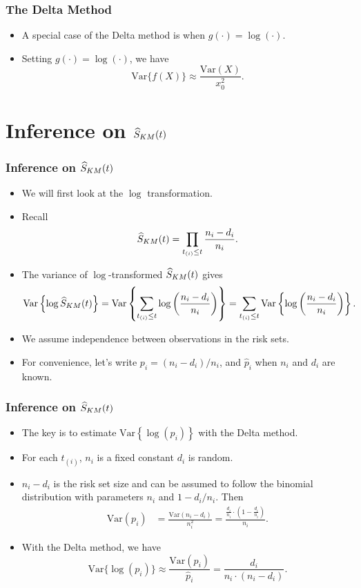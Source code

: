 \documentclass[10pt]{beamer}\usepackage[]{graphicx}\usepackage[]{color}
\newcommand{\Var}{\mathrm{Var}}
\newcommand{\E}{\mathrm{E}}
\newcommand{\Skm}{\widehat{S}_{\scriptsize{KM}}}
\begin{document}
\begin{frame}
  \frametitle{The Delta Method}
  \begin{itemize}
    \item A special case of the Delta method is when $g(\cdot) = \log(\cdot)$.
    \item Setting $g(\cdot) = \log(\cdot)$, we have
      $$ \Var\{f(X)\}\approx \frac{\Var(X)}{x_0^2}.$$
  \end{itemize}
\end{frame}

\section{Inference on $\Skm(t)$}
\begin{frame}
  \frametitle{Inference on $\Skm(t)$}
  \begin{itemize}
    \item We will first look at the $\log$ transformation.
    \item Recall $$\Skm(t) = \prod_{t_{(i)}\le t}\frac{n_i - d_i}{n_i}.$$
    \item The variance of $\log$-transformed $\Skm(t)$ gives
       $$\Var\left\{\log\Skm(t)\right\} = \Var\left\{\sum_{t_{(i)}\le t}\log\left(\frac{n_i - d_i}{n_i}\right)\right\} = 
       \sum_{t_{(i)}\le t}\Var\left\{\log\left(\frac{n_i - d_i}{n_i}\right)\right\}.$$
     \item We assume independence between observations in the risk sets.
     \item For convenience, let's write $p_i = (n_i - d_i) / n_i$, and $\hat p_i$ when $n_i$ and $d_i$ are known.
  \end{itemize}
\end{frame}


\begin{frame}
  \frametitle{Inference on $\Skm(t)$}
  \begin{itemize}
  \item The key is to estimate $\Var\left\{\log\left(p_i\right)\right\}$ with the Delta method.
  \item For each $t_{(i)}$, $n_i$ is a fixed constant $d_i$ is random. 
  \item $n_i - d_i$ is the risk set size and can be assumed to follow the binomial distribution with parameters $n_i$ and $1 - d_i / n_i$.
    Then
    \begin{align*}
      \Var(p_i) &= \frac{\Var(n_i - d_i)}{n_i^2} = \frac{\frac{d_i}{n_i}\cdot\left(1 - \frac{d_i}{n_i}\right)}{n_i}.
    \end{align*}
  \item With the Delta method, we have
    $$ \Var\{\log(p_i)\} \approx \frac{\Var(p_i)}{\hat p_i} = \frac{d_i}{n_i\cdot(n_i-d_i)}. $$
  \end{itemize}
\end{frame}
\end{document}
